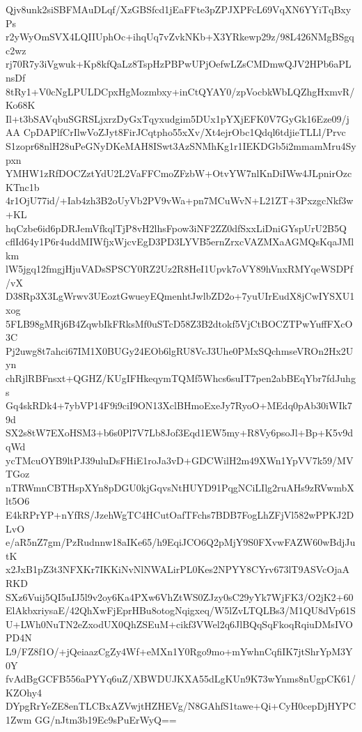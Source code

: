Qjv8unk2siSBFMAuDLqf/XzGBSfcd1jEaFFte3pZPJXPFcL69VqXN6YYiTqBxyPs
r2yWyOmSVX4LQIIUphOc+ihqUq7vZvkNKb+X3YRkewp29z/98L426NMgBSgqc2wz
rj70R7y3iVgwuk+Kp8kfQaLz8TspHzPBPwUPjOefwLZsCMDmwQJV2HPb6aPLnsDf
8tRy1+V0cNgLPULDCpxHgMozmbxy+inCtQYAY0/zpVocbkWbLQZhgHxmvR/Ko68K
Il+t3bSAVqbuSGRSLjxrzDyGxTqyxudgim5DUx1pYXjEFK0V7GyGk16Eze09/jAA
CpDAPlfCrIlwVoZJyt8FirJCqtpho55xXv/Xt4ejrObc1Qdql6tdjieTLLl/Prvc
S1zopr68nlH28uPeGNyDKeMAH8ISwt3AzSNMhKg1r1IEKDGb5i2mmamMru4Sypxn
YMHW1zRfDOCZztYdU2L2VaFFCmoZFzbW+OtvYW7nlKnDiIWw4JLpnirOzcKTnc1b
4r1OjU77id/+Iab4zh3B2oUyVb2PV9vWa+pn7MCuWvN+L21ZT+3PxzgcNkf3w+KL
hqCzbe6id6pDRJemVfkqlTjP8vH2lhsFpow3iNF2ZZ0dfSxxLiDniGYspUrU2B5Q
cflId64y1P6r4uddMIWfjxWjcvEgD3PD3LYVB5ernZrxcVAZMXaAGMQsKqaJMlkm
lW5jgq12fmgjHjuVADsSPSCY0RZ2Uz2R8HeI1Upvk7oVY89hVnxRMYqeWSDPf/vX
D38Rp3X3LgWrwv3UEoztGwueyEQmenhtJwlbZD2o+7yuUIrEudX8jCwIYSXU1xog
5FLB98gMRj6B4ZqwbIkFRksMf0uSTcD58Z3B2dtokf5VjCtBOCZTPwYuffFXcO3C
Pj2uwg8t7ahci67IM1X0BUGy24EOb6lgRU8VcJ3Uhe0PMxSQchmseVROn2Hx2Uyn
chRjlRBFnsxt+QGHZ/KUgIFHkeqymTQMf5Whcs6suIT7pen2abBEqYbr7fdJuhgs
Gq4skRDk4+7ybVP14F9i9ciI9ON13XclBHmoExeJy7RyoO+MEdq0pAb30iWIk79d
SX2s8tW7EXoHSM3+b6s0Pl7V7Lb8Jof3Eqd1EW5my+R8Vy6psoJl+Bp+K5v9dqWd
ycTMcuOYB9ltPJ39uluDsFHiE1roJa3vD+GDCWilH2m49XWn1YpVV7k59/MVTGoz
nTRWmnCBTHspXYn8pDGU0kjGqvsNtHUYD91PqgNCiLIlg2ruAHs9zRVwmbXlt5O6
E4kRPrYP+nYfRS/JzehWgTC4HCutOafTFchs7BDB7FogLhZFjVl582wPPKJ2DLvO
e/aR5nZ7gm/PzRudnnw18aIKe65/h9EqiJCO6Q2pMjY9S0FXvwFAZW60wBdjJutK
x2JxB1pZ3t3NFXKr7IKKiNvNlNWALirPL0Kes2NPYY8CYrv673lT9ASVcOjaARKD
SXz6Vuij5QI5uIJ5l9v2oy6Ka4PXw6VhZtWS0ZJzy0sC29yYk7WjFK3/O2jK2+60
ElAkbxriysaE/42QhXwFjEprHBu8otogNqigxeq/W5lZvLTQLBs3/M1QU8dVp61S
U+LWh0NuTN2eZxodUX0QhZSEuM+cikf3VWel2q6JlBQqSqFkoqRqiuDMsIVOPD4N
L9/FZ8f1O/+jQeiaazCgZy4Wf+eMXn1Y0Rgo9mo+mYwhnCqfiIK7jtShrYpM3Y0Y
fvAdBgGCFB556aPYYq6uZ/XBWDUJKXA55dLgKUn9K73wYnms8nUgpCK61/KZOhy4
DYpgRrYeZE8enTLCBxAZVwjtHZHEVg/N8GAhfS1tawe+Qi+CyH0cepDjHYPC1Zwm
GG/nJtm3b19Ec9sPuErWyQ==
